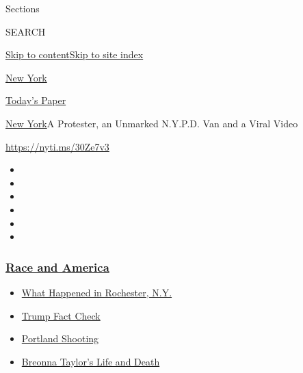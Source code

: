 Sections

SEARCH

\protect\hyperlink{site-content}{Skip to
content}\protect\hyperlink{site-index}{Skip to site index}

\href{https://www.nytimes3xbfgragh.onion/section/nyregion}{New York}

\href{https://myaccount.nytimes3xbfgragh.onion/auth/login?response_type=cookie\&client_id=vi}{}

\href{https://www.nytimes3xbfgragh.onion/section/todayspaper}{Today's
Paper}

\href{/section/nyregion}{New York}\textbar{}A Protester, an Unmarked
N.Y.P.D. Van and a Viral Video

\url{https://nyti.ms/30Ze7v3}

\begin{itemize}
\item
\item
\item
\item
\item
\item
\end{itemize}

\hypertarget{race-and-america}{%
\subsubsection{\texorpdfstring{\href{https://www.nytimes3xbfgragh.onion/news-event/george-floyd-protests-minneapolis-new-york-los-angeles?name=styln-george-floyd\&region=TOP_BANNER\&block=storyline_menu_recirc\&action=click\&pgtype=Article\&impression_id=1c0ed6e0-f2ad-11ea-ae1b-c3bd3735f0b5\&variant=undefined}{Race
and America}}{Race and America}}\label{race-and-america}}

\begin{itemize}
\tightlist
\item
  \href{https://www.nytimes3xbfgragh.onion/2020/09/04/nyregion/rochester-police-daniel-prude.html?name=styln-george-floyd\&region=TOP_BANNER\&block=storyline_menu_recirc\&action=click\&pgtype=Article\&impression_id=1c0ed6e1-f2ad-11ea-ae1b-c3bd3735f0b5\&variant=undefined}{What
  Happened in Rochester, N.Y.}
\item
  \href{https://www.nytimes3xbfgragh.onion/2020/09/01/us/politics/trump-fact-check-protests.html?name=styln-george-floyd\&region=TOP_BANNER\&block=storyline_menu_recirc\&action=click\&pgtype=Article\&impression_id=1c0ed6e2-f2ad-11ea-ae1b-c3bd3735f0b5\&variant=undefined}{Trump
  Fact Check}
\item
  \href{https://www.nytimes3xbfgragh.onion/2020/08/30/us/portland-shooting-explained.html?name=styln-george-floyd\&region=TOP_BANNER\&block=storyline_menu_recirc\&action=click\&pgtype=Article\&impression_id=1c0ed6e3-f2ad-11ea-ae1b-c3bd3735f0b5\&variant=undefined}{Portland
  Shooting}
\item
  \href{https://www.nytimes3xbfgragh.onion/2020/08/30/us/breonna-taylor-police-killing.html?name=styln-george-floyd\&region=TOP_BANNER\&block=storyline_menu_recirc\&action=click\&pgtype=Article\&impression_id=1c0efdf0-f2ad-11ea-ae1b-c3bd3735f0b5\&variant=undefined}{Breonna
  Taylor's Life and Death}
\end{itemize}

